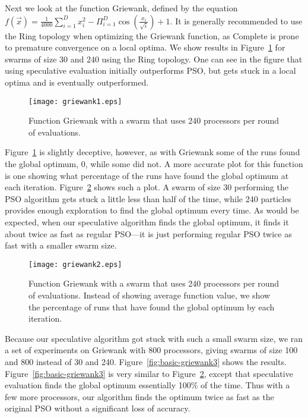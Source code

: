 \documentclass[journal,letterpaper]{IEEEtran}
\newcommand{\fig}[1]{Figure~\ref{fig:#1}}
\begin{document}
Next we look at the function Griewank, defined by the equation $f(\Vec{x}) =
\frac{1}{4000} \sum_{i=1}^D x_i^2 - \Pi_{i=1}^D \cos\left(\frac{x_i}{\sqrt{i}}
\right) + 1$.  It is generally recommended to use the Ring topology when
optimizing the Griewank function, as Complete is prone to premature convergence
on a local optima.  We show results in \fig{basic-griewank1} for swarms of size
30 and 240 using the Ring topology. One can see in the figure that using
speculative evaluation initially outperforms PSO, but gets stuck in a local
optima and is eventually outperformed.  

\begin{figure}
  \centering
  \texttt{[image: griewank1.eps]}
  \caption{Function Griewank with a swarm that uses 240 processors per round of
  evaluations.}
  \label{fig:basic-griewank1}
\end{figure}

\fig{basic-griewank1} is slightly deceptive, however, as with Griewank some of
the runs found the global optimum, 0, while some did not.  A more accurate plot
for this function is one showing what percentage of the runs have found the
global optimum at each iteration.  \fig{basic-griewank2} shows such a plot.  A
swarm of size 30 performing the PSO algorithm gets stuck a little less than
half of the time, while 240 particles provides enough exploration to find the
global optimum every time.  As would be expected, when our speculative
algorithm finds the global optimum, it finds it about twice as fast as regular
PSO---it is just performing regular PSO twice as fast with a smaller swarm
size.

\begin{figure}
  \centering
  \texttt{[image: griewank2.eps]}
  \caption{Function Griewank with a swarm that uses 240 processors per round of
  evaluations.  Instead of showing average function value, we show the
  percentage of runs that have found the global optimum by each iteration.}
  \label{fig:basic-griewank2}
\end{figure}

Because our speculative algorithm got stuck with such a small swarm size, we
ran a set of experiments on Griewank with 800 processors, giving swarms of size
100 and 800 instead of 30 and 240.  \fig{basic-griewank3} shows the results.
\fig{basic-griewank3} is very similar to \fig{basic-griewank2}, except that
speculative evaluation finds the global optimum essentially 100\% of the time.
Thus with a few more processors, our algorithm finds the optimum twice as fast
as the original PSO without a significant loss of accuracy.
\end{document}
